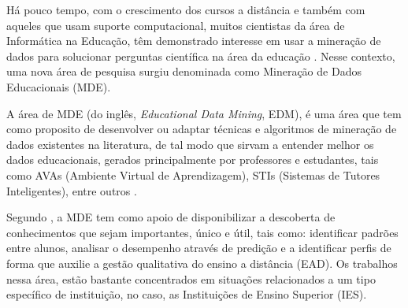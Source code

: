 \par
Há pouco tempo, com o crescimento dos cursos a distância e também com aqueles que usam suporte computacional, muitos cientistas da área de Informática na Educação, têm demonstrado interesse em usar a mineração de dados para solucionar perguntas científica na área da educação \cite{Baker2011}. Nesse contexto, uma nova área de pesquisa surgiu denominada como Mineração de Dados Educacionais (MDE).

\par
A área de MDE (do inglês, \textit{Educational Data Mining}, EDM), é uma área que tem como proposito de desenvolver ou adaptar técnicas e algoritmos de mineração de dados existentes na literatura, de tal modo que sirvam a entender melhor os dados educacionais, gerados principalmente por professores e estudantes, tais como AVAs (Ambiente Virtual de Aprendizagem), STIs (Sistemas de Tutores Inteligentes), entre outros \cite{Costa2012, Marques2014}.

\par
Segundo , a MDE tem como apoio de disponibilizar a descoberta de conhecimentos que sejam importantes, único e útil, tais como: identificar padrões entre alunos, analisar o desempenho através de predição e a identificar perfis de forma que auxilie a gestão qualitativa do ensino a distância (EAD). Os trabalhos nessa área, estão bastante concentrados em situações relacionados a um tipo específico de instituição, no caso, as Instituições de Ensino Superior (IES).

\par

